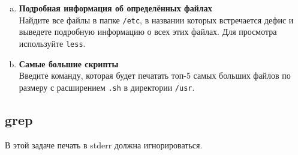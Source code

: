 \documentclass{article}
\begin{document}
\begin{enumerate}[a.]
\item \textbf{Подробная информация об определённых файлах}\\
Найдите все файлы в папке \texttt{/etc}, в названии которых встречается дефис и выведете подробную информацию о всех этих файлах. Для просмотра используйте \texttt{less}.

\item \textbf{Самые большие скрипты}\\
Введите команду, которая будет печатать топ-5 самых больших файлов по размеру с расширением \texttt{.sh} в директории \texttt{/usr}.
\end{enumerate}


\subsection{grep}
В этой задаче печать в stderr должна игнорироваться.
\end{document}
